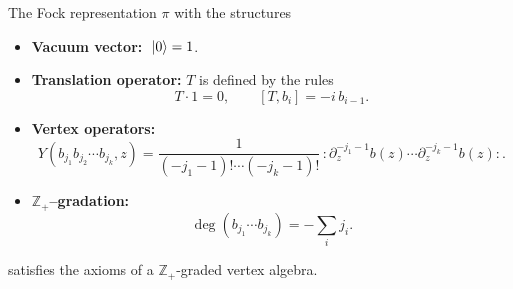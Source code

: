 \documentclass[12pt]{article}
\begin{document}
\begin{theorem}[2.3.7]
The Fock representation $\pi$ with the structures
\begin{itemize}
\item \textbf{Vacuum vector:} $\;\lvert 0 \rangle=1$.
\item \textbf{Translation operator:} $T$ is defined by the rules
\[
T\cdot 1 = 0, \qquad [T,b_i] = -i\,b_{i-1}.
\]
\item \textbf{Vertex operators:}
\[
Y(b_{j_1}b_{j_2}\cdots b_{j_k},z)
= \frac{1}{(-j_1-1)!\cdots(-j_k-1)!}\,
:\partial_z^{-j_1-1}b(z)\cdots \partial_z^{-j_k-1}b(z):.
\]
\item \textbf{$\mathbb{Z}_+$–gradation:}
\[
\deg(b_{j_1}\cdots b_{j_k}) = -\sum_i j_i.
\]
\end{itemize}
satisfies the axioms of a $\mathbb{Z}_+$-graded vertex algebra.
\end{theorem}
\end{document}
